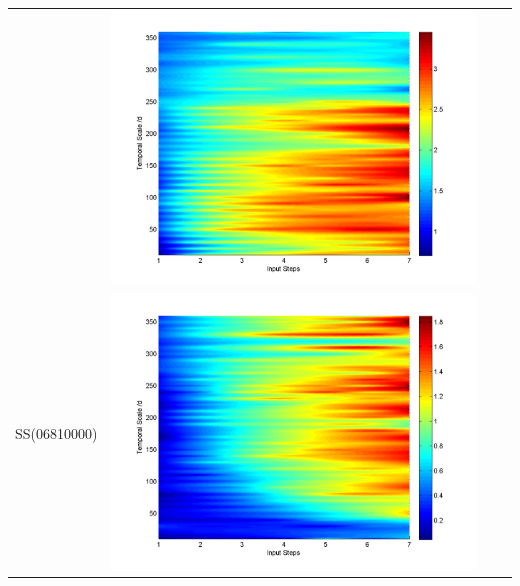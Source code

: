 \documentclass[11pt]{article}
\begin{document}
\begin{table}[H]
{\begin{tabular}{cccc}
&\begin{minipage}{.3\textwidth}\includegraphics[width=\linewidth]{resultgraph/11532500pepq.png}\end{minipage}
\\
SS(06810000)
&\begin{minipage}{.3\textwidth}\includegraphics[width=\linewidth]{resultgraph/06810000p.png}\end{minipage}

\end{tabular}}
\end{table}
\end{document}
